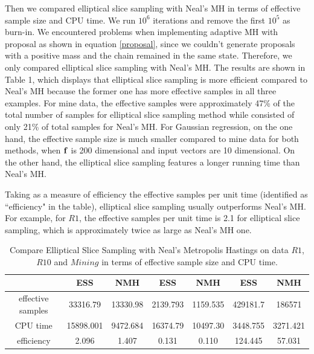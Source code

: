 \documentclass{article}
\begin{document}
Then we compared elliptical slice sampling with Neal's MH in terms of effective sample size and CPU time. We run $10^6$ iterations and remove the first $10^5$ as burn-in. We encountered problems when implementing adaptive MH with proposal as shown in equation \ref{proposal}, since we couldn't generate proposals with a positive mass and the chain remained in the same state. Therefore, we only compared elliptical slice sampling with Neal's MH. The results are shown in Table 1, which displays that elliptical slice sampling is more efficient compared to Neal's MH because the former one has more effective samples in all three examples. For mine data, the effective samples were approximately 47\% of the total number of samples for elliptical slice sampling method while consisted of only 21\% of total samples for Neal's MH. For Gaussian regression, on the one hand, the effective sample size is much smaller compared to mine data for both methods, when $\bf{f}$ is 200 dimensional and input vectors are 10 dimensional. On the other hand, the elliptical slice sampling features a longer running time than Neal's MH.

Taking as a measure of efficiency the effective samples per unit time (identified as ``efficiency" in the table), elliptical slice sampling usually outperforms Neal's MH. For example, for $R1$, the effective samples per unit time is 2.1 for elliptical slice sampling, which is approximately twice as large as Neal's MH one.


\begin{table}[h]
\begin{center}
\begin{tabular} { c | c c | c c | c c }
{}   & ESS   & NMH    & ESS   & NMH  & ESS   & NMH\\
\hline
effective samples   &  33316.79 & 13330.98   & 2139.793  & 1159.535 & 429181.7 & 186571\\
CPU time   &  15898.001 & 9472.684   & 16374.79  & 10497.30 & 3448.755 & 3271.421\\
efficiency & 2.096 & 1.407 & 0.131 & 0.110 & 124.445 & 57.031 \\
\end{tabular}
\caption{Compare Elliptical Slice Sampling with Neal's Metropolis Hastings on data $R1$, $R10$ and $Mining$ in terms of effective sample size and CPU time.}
\end{center}
\end{table}
\end{document}
